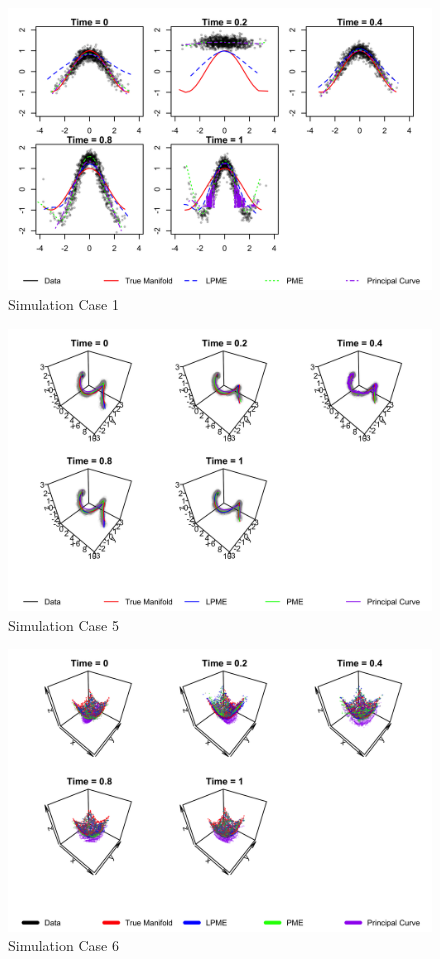 \documentclass[11pt,reqno]{article}
\renewcommand{\textwidth}{180mm}
\theoremstyle{definition}
\begin{document}
\begin{figure}[h]
  \centering
  \includegraphics[width=\textwidth]{sim_case1}
  \caption{Simulation Case 1}
  \label{fig:sim_case1}
\end{figure}

\begin{figure}[h]
  \centering
  \includegraphics[width=\textwidth]{sim_case5}
  \caption{Simulation Case 5}
  \label{fig:sim_case4}
\end{figure}

\begin{figure}[h]
  \centering
  \includegraphics[width=\textwidth]{sim_case7}
  \caption{Simulation Case 6}
  \label{fig:sim_case6}
\end{figure}
\end{document}
